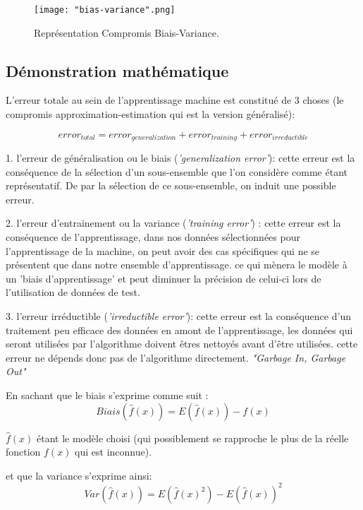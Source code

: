 \documentclass[a4paper]{article}
\begin{document}
\begin{figure}[!h]
	\centering
	\texttt{[image: "bias-variance".png]}
	\caption{Représentation Compromis Biais-Variance. \cite{ReconcilingModernML}}
	\label{Bias-Variance}
\end{figure}

\newpage

\subsection{Démonstration mathématique}

L'erreur totale au sein de l'apprentissage machine est constitué de 3 choses (le compromis approximation-estimation qui est la version généralisé): \newline

\[ error_{total} = error_{generalization} + error_{training} + error_{irreductible} \]

1. l'erreur de généralisation ou le biais (\textit{'generalization error'}): cette erreur est la conséquence de la sélection d'un sous-ensemble que l'on considère comme étant représentatif. De par la sélection de ce sous-ensemble, on induit une possible erreur.\newline

2. l'erreur d'entrainement ou la variance (\textit{'training error'}) : cette erreur est la conséquence de l'apprentissage, dans nos données sélectionnées pour l'apprentissage de la machine, on peut avoir des cas spécifiques qui ne se présentent que dans notre ensemble d'apprentissage. ce qui mènera le modèle à un 'biais d'apprentissage' et peut diminuer la précision de celui-ci lors de l'utilisation de données de test.\newline

3. l'erreur irréductible (\textit{'irreductible error'}): cette erreur est la conséquence d'un traitement peu efficace des données en amont de l'apprentissage, les données qui seront utilisées par l'algorithme doivent êtres nettoyés avant d'être utilisées. cette erreur ne dépends donc pas de l'algorithme directement. \textit{"Garbage In, Garbage Out"}\newline


En sachant que le biais s'exprime comme suit : 
\[ Biais(\hat{f}(x)) = E(\hat{f}(x)) - f(x)\]

 $\hat{f}(x)$ étant le modèle choisi (qui possiblement se rapproche le plus de la réelle fonction $f(x)$ qui est inconnue).
 
 et que la variance s'exprime ainsi: 
 \[ Var(\hat{f}(x)) = E(\hat{f}(x)^2) - E(\hat{f}(x))^2 \]
\end{document}
